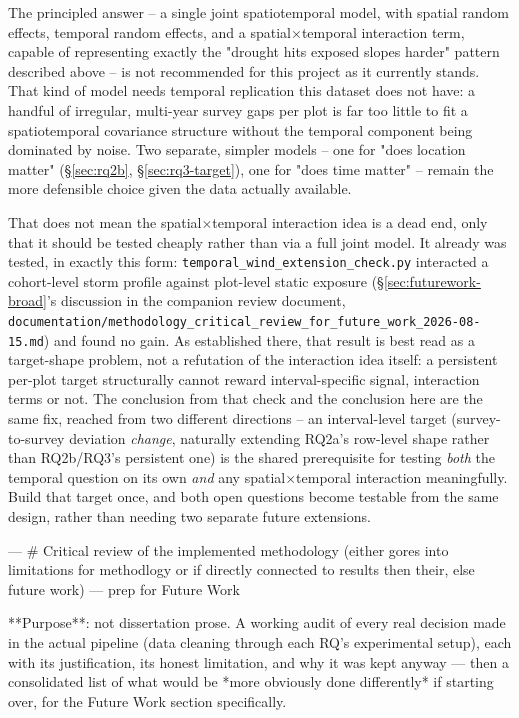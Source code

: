 The principled answer -- a single joint spatiotemporal model, with spatial random effects,
temporal random effects, and a spatial$\times$temporal interaction term, capable of representing
exactly the "drought hits exposed slopes harder" pattern described above -- is not recommended for
this project as it currently stands. That kind of model needs temporal replication this dataset
does not have: a handful of irregular, multi-year survey gaps per plot is far too little to fit a
spatiotemporal covariance structure without the temporal component being dominated by noise. Two
separate, simpler models -- one for "does location matter" (\S\ref{sec:rq2b}, \S\ref{sec:rq3-target}),
one for "does time matter" -- remain the more defensible choice given the data actually available.

That does not mean the spatial$\times$temporal interaction idea is a dead end, only that it should
be tested cheaply rather than via a full joint model. It already was tested, in exactly this form:
\texttt{temporal\_wind\_extension\_check.py} interacted a cohort-level storm profile against
plot-level static exposure (\S\ref{sec:futurework-broad}'s discussion in the companion review
document, \texttt{documentation/methodology\_critical\_review\_for\_future\_work\_2026-08-15.md})
and found no gain. As established there, that result is best read as a target-shape problem, not a
refutation of the interaction idea itself: a persistent per-plot target structurally cannot reward
interval-specific signal, interaction terms or not. The conclusion from that check and the
conclusion here are the same fix, reached from two different directions -- an interval-level target
(survey-to-survey deviation \emph{change}, naturally extending RQ2a's row-level shape rather than
RQ2b/RQ3's persistent one) is the shared prerequisite for testing \emph{both} the temporal question
on its own \emph{and} any spatial$\times$temporal interaction meaningfully. Build that target once,
and both open questions become testable from the same design, rather than needing two separate
future extensions.


--- # Critical review of the implemented methodology (either gores into limitations for methodlogy or if directly connected to results then their, else future work) — prep for Future Work

**Purpose**: not dissertation prose. A working audit of every real decision made in the actual
pipeline (data cleaning through each RQ's experimental setup), each with its justification, its
honest limitation, and why it was kept anyway — then a consolidated list of what would be *more
obviously done differently* if starting over, for the Future Work section specifically.

